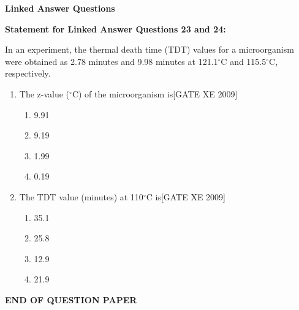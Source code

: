 \documentclass[journal,12pt,onecolumn]{IEEEtran}
\theoremstyle{remark}
\begin{document}
\vspace{1em}
\noindent\textbf{Linked Answer Questions}

\noindent\textbf{Statement for Linked Answer Questions 23 and 24:}

\vspace{0.5em}
In an experiment, the thermal death time (TDT) values for a microorganism were obtained as 2.78 minutes and 9.98 minutes at 121.1$^\circ$C and 115.5$^\circ$C, respectively.

\begin{enumerate}[start=23, label=\textbf{Q.\arabic*.}, wide=0pt, leftmargin=*]

\item The z-value ($^\circ$C) of the microorganism is\hfill[GATE XE 2009]

\begin{multicols}{2}
\begin{enumerate}
\item 9.91
\item 9.19
\item 1.99
\item 0.19
\end{enumerate}
\end{multicols}

\item The TDT value (minutes) at 110$^\circ$C is\hfill[GATE XE 2009]

\begin{multicols}{2}
\begin{enumerate}
\item 35.1
\item 25.8
\item 12.9
\item 21.9
\end{enumerate}
\end{multicols}

\end{enumerate}

\vspace{1em}
\begin{center}
\textbf{END OF QUESTION PAPER}
\end{center}



    
\end{document}
